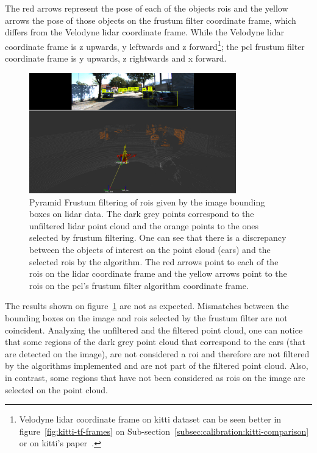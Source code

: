 The red arrows represent the pose of each of the objects \acp{roi} and the yellow arrows the pose of those objects on the frustum filter coordinate frame, which differs from the Velodyne \ac{lidar} coordinate frame. While the Velodyne \ac{lidar} coordinate frame is z upwards, y leftwards and z forward\footnote{Velodyne \ac{lidar} coordinate frame on \ac{kitti} dataset can be seen better in figure~\ref{fig:kitti-tf-frames} on Sub-section~\ref{subsec:calibration:kitti-comparison} or on \ac{kitti}'s paper~\cite{Geiger2013a}.}; the \ac{pcl} frustum filter coordinate frame is y upwards, z rightwards and x forward.

\begin{figure}[ht]
	\centering
	\includegraphics[width=0.8\textwidth]{img/image-object-to-point-cloud/bbox_correspondences_on_kitti.png}
	\caption{Pyramid Frustum filtering of \acp{roi} given by the image bounding boxes on \ac{lidar} data. The dark grey points correspond to the unfiltered \ac{lidar} point cloud and the orange points to the ones selected by frustum filtering. One can see that there is a discrepancy between the objects of interest on the point cloud (cars) and the selected \acp{roi} by the algorithm. The red arrows point to each of the \acp{roi} on the \ac{lidar} coordinate frame and the yellow arrows point to the \acp {roi} on the \ac{pcl}'s frustum filter algorithm coordinate frame.}
	\label{fig:bbox-correspondences-on-kitti}
\end{figure}

The results shown on figure~\ref{fig:bbox-correspondences-on-kitti} are not as expected. Mismatches between the bounding boxes on the image and \acp{roi} selected by the frustum filter are not coincident. Analyzing the unfiltered and the filtered point cloud, one can notice that some regions of the dark grey point cloud that correspond to the cars (that are detected on the image), are not considered a \ac{roi} and therefore are not filtered by the algorithms implemented and are not part of the filtered point cloud. Also, in contrast, some regions that have not been considered as \acp{roi} on the image are selected on the point cloud.

